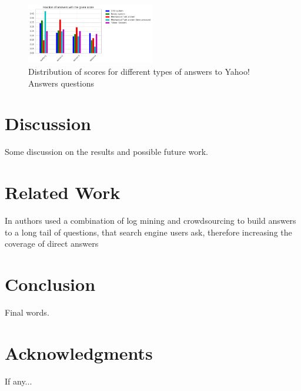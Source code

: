 \documentclass[11pt,letterpaper]{article}
\begin{document}
\begin{figure}[h]
\centering
\includegraphics[width=0.5\textwidth]{img/scores_distribution}
\caption{Distribution of scores for different types of answers to Yahoo! Answers questions}
\label{fig:scores_distribution}
\end{figure}

\section{Discussion}
\label{sec:discussion}

Some discussion on the results and possible future work.

\section{Related Work}
\label{sec:related_work}

In \cite{bernstein2012direct} authors used a combination of log mining and crowdsourcing to build answers to a long tail of questions, that search engine users ask, therefore increasing the coverage of direct answers

\section{Conclusion}
\label{sec:conclusion}

Final words.

\section*{Acknowledgments}

If any...



\end{document}
